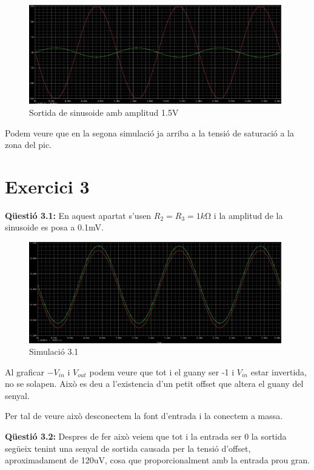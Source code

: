 \documentclass[12pt, a4papre]{article}
\begin{document}
	\begin{figure}[H]
		\begin{center}
		\includegraphics[width=110mm]{Captura_2.4_2.PNG}
		\caption{Sortida de sinusoide amb amplitud 1.5V}
		\end{center}
	\end{figure}
	
	Podem veure que en la segona simulació ja arriba a la tensió de saturació a la zona del pic.
	
	\section{Exercici 3} 
	
	\textbf{Qüestió 3.1:} En aquest apartat s'usen $R_2 = R_3 = 1k\si{\ohm}$ i la amplitud de la sinusoide es posa a 0.1mV.
	
	\begin{figure}[H]
		\begin{center}
		\includegraphics[width=110mm]{Captura_3.1.PNG}
		\caption{Simulació 3.1}
		\end{center}
	\end{figure}
	
	Al graficar $-V_{in}$ i $V_{out}$ podem veure que tot i el guany ser -1 i $V_{in}$ estar invertida, no se solapen. Això es deu a l'existencia d'un petit offset que altera el guany del senyal.
	
	Per tal de veure això desconectem la font d'entrada i la conectem a massa.
	
	\textbf{Qüestió 3.2:} Despres de fer això veiem que tot i la entrada ser 0 la sortida següeix tenint una senyal de sortida causada per la tensió d'offset, aproximadament de 120uV, cosa que proporcionalment amb la entrada prou gran.
	
\end{document}
